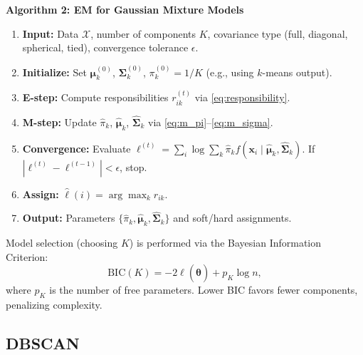 \documentclass[conference]{IEEEtran}
\begin{document}
\textbf{Algorithm 2: EM for Gaussian Mixture Models}
\begin{enumerate}
    \item \textbf{Input:} Data $\mathcal{X}$, number of components $K$, covariance type (full, diagonal, spherical, tied), convergence tolerance $\epsilon$.
    \item \textbf{Initialize:} Set $\boldsymbol{\mu}_k^{(0)}$, $\boldsymbol{\Sigma}_k^{(0)}$, $\pi_k^{(0)} = 1/K$ (e.g., using $k$-means output).
    \item \textbf{E-step:} Compute responsibilities $r_{ik}^{(t)}$ via \eqref{eq:responsibility}.
    \item \textbf{M-step:} Update $\hat{\pi}_k$, $\hat{\boldsymbol{\mu}}_k$, $\hat{\boldsymbol{\Sigma}}_k$ via \eqref{eq:m_pi}--\eqref{eq:m_sigma}.
    \item \textbf{Convergence:} Evaluate $\ell^{(t)} = \sum_i \log \sum_k \hat{\pi}_k f(\mathbf{x}_i \mid \hat{\boldsymbol{\mu}}_k, \hat{\boldsymbol{\Sigma}}_k)$. If $|\ell^{(t)} - \ell^{(t-1)}| < \epsilon$, stop.
    \item \textbf{Assign:} $\hat{\ell}(i) = \arg\max_k r_{ik}$.
    \item \textbf{Output:} Parameters $\{\hat{\pi}_k, \hat{\boldsymbol{\mu}}_k, \hat{\boldsymbol{\Sigma}}_k\}$ and soft/hard assignments.
\end{enumerate}

Model selection (choosing $K$) is performed via the Bayesian Information Criterion:
\begin{equation}
\mathrm{BIC}(K) = -2\ell(\hat{\boldsymbol{\theta}}) + p_K \log n,
\label{eq:bic}
\end{equation}
where $p_K$ is the number of free parameters. Lower BIC favors fewer components, penalizing complexity.

\subsection{DBSCAN}
\end{document}

